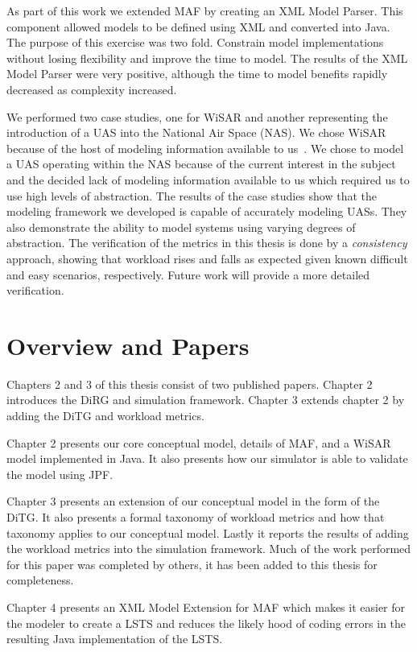 As part of this work we extended MAF by creating an XML Model Parser.  This component allowed models to be defined using XML and converted into Java.  The purpose of this exercise was two fold.  Constrain model implementations without losing  flexibility and improve the time to model.  The results of the XML Model Parser were very positive, although the time to model benefits rapidly decreased as complexity increased.

We performed two case studies, one for WiSAR and another representing the introduction of a UAS into the National Air Space (NAS).  We chose WiSAR because of the host of modeling information available to us~\cite{adams2009cognitive}.  We chose to model a UAS operating within the NAS because of the current interest in the subject~\cite{nasroadmap} and the decided lack of modeling information available to us which required us to use high levels of abstraction.  The results of the case studies show that the modeling framework we developed is capable of accurately modeling UASs.  They also demonstrate the ability to model systems using varying degrees of abstraction.  The verification of the metrics in this thesis is done by a {\em consistency} approach, showing that workload rises and falls as expected given known difficult and easy scenarios, respectively.  Future work will provide a more detailed verification.


\section{Overview and Papers}

Chapters 2 and 3 of this thesis consist of two published papers.  Chapter 2 introduces the DiRG and simulation framework.  Chapter 3 extends chapter 2 by adding the DiTG and workload metrics.

Chapter 2 presents our core conceptual model, details of MAF, and a WiSAR model implemented in Java.  It also presents how our simulator is able to validate the model using JPF.

Chapter 3 presents an extension of our conceptual model in the form of the DiTG.  It also presents a formal taxonomy of workload metrics and how that taxonomy applies to our conceptual model.  Lastly it reports the results of adding the workload metrics into the simulation framework.  Much of the work performed for this paper was completed by others, it has been added to this thesis for completeness.

Chapter 4 presents an XML Model Extension for MAF which makes it easier for the modeler to create a LSTS and reduces the likely hood of coding errors in the resulting Java implementation of the LSTS.

